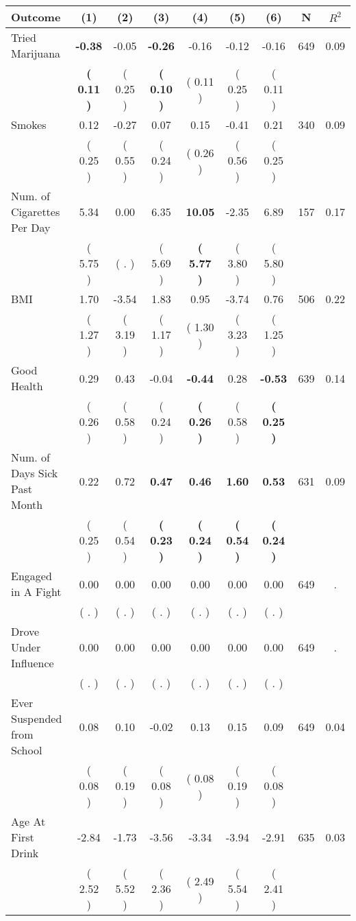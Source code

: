 \begin{tabular}{lcccccccc}
\toprule
 \textbf{Outcome} & \textbf{(1)} & \textbf{(2)} & \textbf{(3)} & \textbf{(4)} & \textbf{(5)} & \textbf{(6)} & \textbf{N} & \textbf{$ R^2$} \\
\midrule
Tried Marijuana & \textbf{    -0.38} &     -0.05 & \textbf{    -0.26} &     -0.16 &     -0.12 &     -0.16 & 649 &       0.09 \\ 
 & \textbf{(     0.11 )} & (     0.25 ) & \textbf{(     0.10 )} & (     0.11 ) & (     0.25 ) & (     0.11 ) & \\
Smokes &      0.12 &     -0.27 &      0.07 &      0.15 &     -0.41 &      0.21 & 340 &       0.09 \\ 
 & (     0.25 ) & (     0.55 ) & (     0.24 ) & (     0.26 ) & (     0.56 ) & (     0.25 ) & \\
Num. of Cigarettes Per Day &      5.34 &      0.00 &      6.35 & \textbf{    10.05} &     -2.35 &      6.89 & 157 &       0.17 \\ 
 & (     5.75 ) & (        . ) & (     5.69 ) & \textbf{(     5.77 )} & (     3.80 ) & (     5.80 ) & \\
BMI &      1.70 &     -3.54 &      1.83 &      0.95 &     -3.74 &      0.76 & 506 &       0.22 \\ 
 & (     1.27 ) & (     3.19 ) & (     1.17 ) & (     1.30 ) & (     3.23 ) & (     1.25 ) & \\
Good Health &      0.29 &      0.43 &     -0.04 & \textbf{    -0.44} &      0.28 & \textbf{    -0.53} & 639 &       0.14 \\ 
 & (     0.26 ) & (     0.58 ) & (     0.24 ) & \textbf{(     0.26 )} & (     0.58 ) & \textbf{(     0.25 )} & \\
Num. of Days Sick Past Month &      0.22 &      0.72 & \textbf{     0.47} & \textbf{     0.46} & \textbf{     1.60} & \textbf{     0.53} & 631 &       0.09 \\ 
 & (     0.25 ) & (     0.54 ) & \textbf{(     0.23 )} & \textbf{(     0.24 )} & \textbf{(     0.54 )} & \textbf{(     0.24 )} & \\
Engaged in A Fight &      0.00 &      0.00 &      0.00 &      0.00 &      0.00 &      0.00 & 649 &          . \\ 
 & (        . ) & (        . ) & (        . ) & (        . ) & (        . ) & (        . ) & \\
Drove Under Influence &      0.00 &      0.00 &      0.00 &      0.00 &      0.00 &      0.00 & 649 &          . \\ 
 & (        . ) & (        . ) & (        . ) & (        . ) & (        . ) & (        . ) & \\
Ever Suspended from School &      0.08 &      0.10 &     -0.02 &      0.13 &      0.15 &      0.09 & 649 &       0.04 \\ 
 & (     0.08 ) & (     0.19 ) & (     0.08 ) & (     0.08 ) & (     0.19 ) & (     0.08 ) & \\
Age At First Drink &     -2.84 &     -1.73 &     -3.56 &     -3.34 &     -3.94 &     -2.91 & 635 &       0.03 \\ 
 & (     2.52 ) & (     5.52 ) & (     2.36 ) & (     2.49 ) & (     5.54 ) & (     2.41 ) & \\
\bottomrule
\end{tabular}
